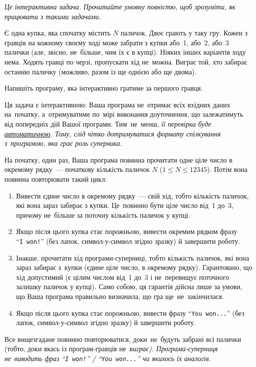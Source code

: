 ﻿{\it Це інтерактивна задача. Прочитайте умовну повністю, щоб зрозуміти, як працювати з такими задачами.}

Є одна купка, яка спочатку містить $N$ паличок.
Двоє грають у таку гру.
Кожен з гравців на кожному своєму ході може забрати з купки або~1, або~2, або~3 палички (але, звісно, не~більше, чим їх є в купці).
Ніяких інших варіантів ходу нема. 
Ходять гравці по черзі, пропускати хід не~можна.
Виграє той, хто забирає останню паличку (можливо, разом із ще однією або ще двома).

Напишіть програму, яка інтерактивно гратиме за першого гравця.

Ця задача є інтерактивною: 
Ваша програма не~отримає всіх вхідних даних на~початку,
а~отримуватиме по~мірі виконання доуточнення, 
що залежатимуть від попередніх дій Вашої програми. 
Тим~не~менш, \it{її перевірка буде
\underline{автоматичною}}. 
Тому, слід чітко дотримуватися формату спілкування з~програмою, яка грає роль суперника.


\Interaction 

На початку, один раз, Ваша програма повинна прочитати одне ціле число в окремому рядку~--- початкову кількість паличок $N$ ($1{\leqslant}N{\leqslant}12345$).
Потім вона повинна повторювати такий цикл:
\begin{enumerate}
\item
Вивести єдине число в окремому рядку~--- свій хід, тобто кількість паличок, які вона зараз забирає з купки.
Це~повинно бути ціле число від~1 до~3, причому не~більше за поточну кількість паличок у купці. 
\item
Якщо після цього купка стає порожньою, 
вивести окремим рядком фразу ``\texttt{I~won!}''
(без лапок, символ-у-символ згідно зразку) й завершити роботу.
\item
Інакше, прочитати хід програми-суперниці, тобто кількість паличок, які вона зараз забирає з~купки (єдине ціле число, в окремому рядку).
Гарантовано, що хід допустимий (є цілим числом від~1 до~3 і не~перевищує поточного залишку паличок у купці).
Само собою, ця гарантія дійсна лише за умови, що Ваша програма правильно визначила, що гра ще~не~закінчилася.
\item
Якщо після цього купка стає порожньою, 
вивести %
фразу ``\texttt{You~won...}''
(без лапок, символ-у-символ згідно зразку) й завершити роботу.
\end{enumerate}
Все вищезгадане повинно повторюватися, доки~не~будуть забрані всі палички (тобто, доки якась із програм-гравців не~в\it{и}грає).
Програма-суперниця не~виводить фраз ``\texttt{I~won!}'' / ``\texttt{You~won...}'' 
чи якихось їх аналогів.

